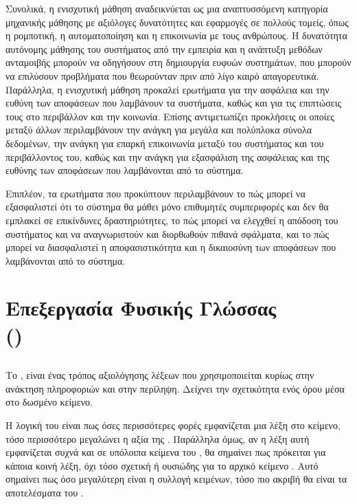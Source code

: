Συνολικά, η ενισχυτική μάθηση αναδεικνύεται ως μια αναπτυσσόμενη κατηγορία μηχανικής μάθησης με αξιόλογες δυνατότητες και εφαρμογές σε πολλούς τομείς, όπως η ρομποτική, η αυτοματοποίηση και η επικοινωνία με τους ανθρώπους. Η δυνατότητα αυτόνομης μάθησης του συστήματος από την εμπειρία και η ανάπτυξη μεθόδων ανταμοιβής μπορούν να οδηγήσουν στη δημιουργία ευφυών συστημάτων, που μπορούν να επιλύσουν προβλήματα που θεωρούνταν πριν από λίγο καιρό απαγορευτικά. Παράλληλα, η ενισχυτική μάθηση προκαλεί ερωτήματα για την ασφάλεια και την ευθύνη των αποφάσεων που λαμβάνουν τα συστήματα, καθώς και για τις επιπτώσεις τους στο περιβάλλον και την κοινωνία. Επίσης αντιμετωπίζει προκλήσεις οι οποίες μεταξύ άλλων περιλαμβάνουν την ανάγκη για μεγάλα και πολύπλοκα σύνολα δεδομένων, την ανάγκη για επαρκή επικοινωνία μεταξύ του συστήματος και του περιβάλλοντος του, καθώς και την ανάγκη για εξασφάλιση της ασφάλειας και της ευθύνης των αποφάσεων που λαμβάνονται από το σύστημα.

Επιπλέον, τα ερωτήματα που προκύπτουν περιλαμβάνουν το πώς μπορεί να εξασφαλιστεί ότι το σύστημα θα μάθει μόνο επιθυμητές συμπεριφορές και δεν θα εμπλακεί σε επικίνδυνες δραστηριότητες, το πώς μπορεί να ελεγχθεί η απόδοση του συστήματος και να αναγνωριστούν και διορθωθούν πιθανά σφάλματα, και το πώς μπορεί να διασφαλιστεί η αποφασιστικότητα και η δικαιοσύνη των αποφάσεων που λαμβάνονται από το σύστημα.
\clearpage


\section{Επεξεργασία Φυσικής Γλώσσας \\()}

\subsection{}
Το , είναι ένας τρόπος αξιολόγησης λέξεων που χρησιμοποιείται κυρίως στην ανάκτηση πληροφοριών και στην περίληψη. Δείχνει την σχετικότητα ενός όρου μέσα στο δωσμένο κείμενο. 

Η λογική του είναι πως όσες περισσότερες φορές εμφανίζεται μια λέξη στο κείμενο, τόσο περισσότερο μεγαλώνει η αξία της . Παράλληλα όμως, αν η λέξη αυτή εμφανίζεται συχνά και σε υπόλοιπα κείμενα του , θα σημαίνει πως πρόκειται για κάποια κοινή λέξη, όχι τόσο σχετική ή ουσιώδης για το αρχικό κείμενο . Αυτό σημαίνει πως όσο μεγαλύτερη είναι η συλλογή κειμένων, τόσο πιο ακριβή θα είναι τα αποτελέσματα του . 

